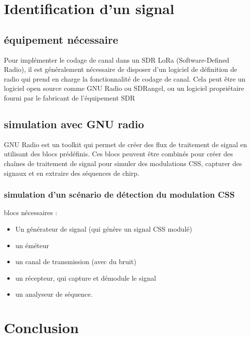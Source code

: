 \documentclass[12pt,a4paper,oneside, titlepage]{report}
\begin{document}
\chapter{Identification d'un signal}
\renewcommand{\leftmark}{CHAPITRE \thechapter.~~Titre Expérimentation de LoRa sur un SDR}

\section{équipement nécessaire}

Pour implémenter le codage de canal dans un SDR LoRa (Software-Defined Radio), il est généralement nécessaire de disposer d'un logiciel de définition de radio qui prend en charge la fonctionnalité de codage de canal. Cela peut être un logiciel open source comme GNU Radio ou SDRangel, ou un logiciel propriétaire fourni par le fabricant de l'équipement SDR

\section{simulation avec GNU radio}

GNU Radio est un toolkit qui permet de créer des flux de traitement de signal en utilisant des blocs prédéfinis. Ces blocs peuvent être combinés pour créer des chaînes de traitement de signal pour simuler des modulations CSS, capturer des signaux et en extraire des séquences de chirp.

\subsection{simulation d'un scénario de détection du modulation CSS}

blocs nécessaires :
\begin{itemize}
\item Un générateur de signal (qui génère un signal CSS modulé)
\item un éméteur
\item un canal de transmission (avec du bruit)
\item un récepteur, qui capture et démodule le signal
\item un analyseur de séquence.
\end{itemize}

\chapter*{Conclusion}
\renewcommand{\leftmark}{CONCLUSION}
\end{document}
